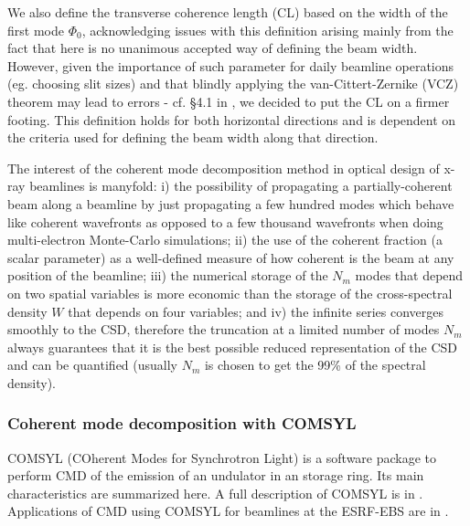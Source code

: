 \documentclass{iucr}              %
\newcommand{\todo}[1]{{\color{red}[TODO: "#1'']}}
\begin{document}
We also define the transverse coherence length (CL) based on the width of the first mode $\Phi_0$, acknowledging issues with this definition arising mainly from the fact that here is no unanimous accepted way of defining the beam width. However, given the importance of such parameter for daily beamline operations (eg. choosing slit sizes) and that blindly applying the van-Cittert-Zernike (VCZ) theorem may lead to errors - cf. §4.1 in \cite{geloni2008}, we decided to put the CL on a firmer footing. This definition holds for both horizontal directions and is dependent on the criteria used for defining the beam width along that direction. %

The interest of the coherent mode decomposition method in optical design of x-ray beamlines is manyfold: i) the possibility of propagating a partially-coherent beam along a beamline by just propagating a few hundred modes which behave like coherent wavefronts as opposed to a few thousand wavefronts when doing multi-electron Monte-Carlo simulations; ii) the use of the coherent fraction (a scalar parameter) as a well-defined measure of how coherent is the beam at any position of the beamline; iii) the numerical storage of the $N_m$ modes that depend on two spatial variables is more economic than the storage of the cross-spectral density $W$ that depends on four variables; and iv) the infinite series converges smoothly to the CSD, therefore the truncation at a limited number of modes $N_m$ always guarantees that it is the best possible reduced representation of the CSD and can be quantified (usually $N_m$ is chosen to get the 99\% of the spectral density). 

\subsubsection{Coherent mode decomposition with COMSYL} 

COMSYL (COherent Modes for Synchrotron Light) \cite{codeCOMSYL} is a software package to perform CMD of the emission of an undulator in an storage ring. Its main characteristics are summarized here. A full description of COMSYL is in \cite{glassThesis}. Applications of CMD using COMSYL for beamlines at the ESRF-EBS are in \cite{glass2017, hierarchical}. 
\end{document}
